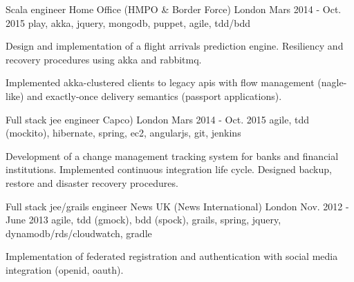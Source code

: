 \begin{cventries}
  \cventry
    {Scala engineer} %
    {\hspace{0.5em}Home Office (HMPO \& Border Force)} %
    {London} %
    {Mars 2014 - Oct. 2015} %
    {play, akka, jquery, mongodb, puppet, agile, tdd/bdd} %
    {
      \begin{cvitems} %
        \item {Design and implementation of a flight arrivals prediction engine. Resiliency and recovery procedures using akka and rabbitmq.}
        \item {Implemented akka-clustered clients to legacy apis with flow management (nagle-like) and exactly-once delivery semantics (passport applications).}
      \end{cvitems}
    }

  \cventry
    {Full stack jee engineer} %
    {\hspace{0.5em}Capco)} %
    {London} %
    {Mars 2014 - Oct. 2015} %
    {agile, tdd (mockito), hibernate, spring, ec2, angularjs, git, jenkins} %
    {
      \begin{cvitems} %
        \item {Development of a change management tracking system for banks and financial institutions. Implemented continuous integration life cycle. Designed backup, restore and disaster recovery procedures.}
      \end{cvitems}
    }

  \cventry
    {Full stack jee/grails engineer} %
    {\hspace{0.3em}News UK (News International)} %
    {London} %
    {Nov. 2012 - June 2013} %
    {agile, tdd (gmock), bdd (spock), grails, spring, jquery, dynamodb/rds/cloudwatch, gradle} %
    {
      \begin{cvitems} %
        \item {Implementation of federated registration and authentication with social media integration (openid, oauth).}
      \end{cvitems}
    }


\end{cventries}
